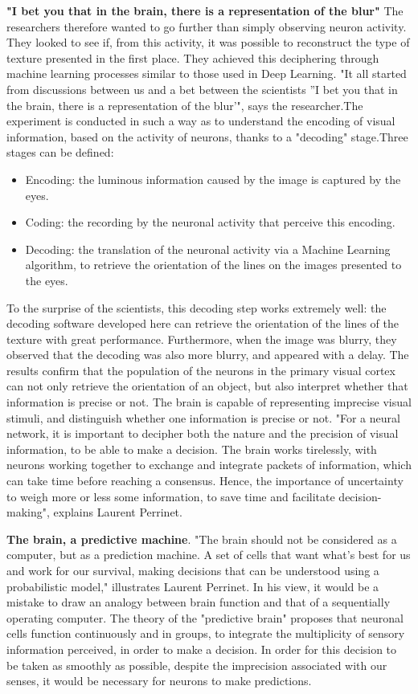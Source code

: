 \textbf{"I bet you that in the brain, there is a representation of the blur"}
The researchers therefore wanted to go further than simply observing neuron activity. They looked to see if, from this activity, it was possible to reconstruct the type of texture presented in the first place. They achieved this deciphering through machine learning processes similar to those used in Deep Learning.   "It all started from discussions between us and a bet between the scientists ''I bet you that in the brain, there is a representation of the blur'", says the researcher.The experiment is conducted in such a way as to understand the encoding of visual information, based on the activity of neurons, thanks to a "decoding" stage.Three stages can be defined:
\begin{itemize}
    \item Encoding: the luminous information caused by the image is captured by the eyes.
    \item Coding: the recording by the neuronal activity that perceive this encoding.
    \item Decoding: the translation of the neuronal activity via a Machine Learning algorithm, to retrieve the orientation of the lines on the images presented to the eyes.
\end{itemize}
To the surprise of the scientists, this decoding step works extremely well: the decoding software developed here can retrieve the orientation of the lines of the texture with great performance. Furthermore, when the image was blurry, they observed that the decoding was also more blurry, and appeared with a delay. The results confirm that the population of the neurons in the primary visual cortex can not only retrieve the orientation of an object, but also interpret whether that information is precise or not. The brain is capable of representing imprecise visual stimuli, and distinguish whether one information is precise or not. "For a neural network, it is important to decipher both the nature and the precision of visual information, to be able to make a decision. The brain works tirelessly, with neurons working together to exchange and integrate packets of information, which can take time before reaching a consensus. Hence, the importance of uncertainty to weigh more or less some information, to save time and facilitate decision-making", explains Laurent Perrinet.

\textbf{The brain, a predictive machine}.
"The brain should not be considered as a computer, but as a prediction machine. A set of cells that want what's best for us and work for our survival, making decisions that can be understood using a probabilistic model," illustrates Laurent Perrinet. In his view, it would be a mistake to draw an analogy between brain function and that of a sequentially operating computer. The theory of the "predictive brain" proposes that neuronal cells function continuously and in groups, to integrate the multiplicity of sensory information perceived, in order to make a decision. In order for this decision to be taken as smoothly as possible, despite the imprecision associated with our senses, it would be necessary for neurons to make predictions.

